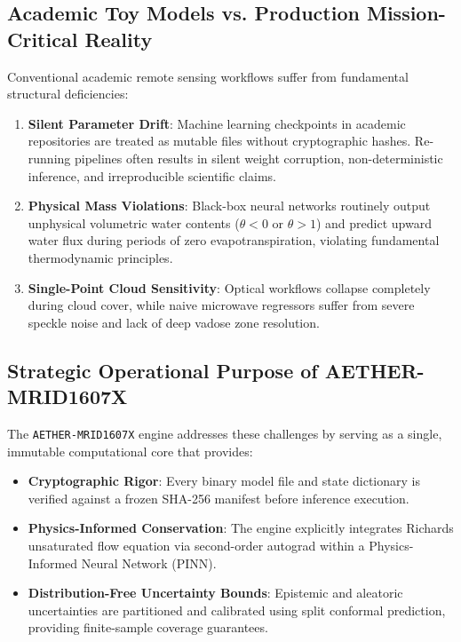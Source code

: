 \documentclass[11pt,a4paper]{article}
\theoremstyle{definition}
\theoremstyle{remark}
\begin{document}
\subsection{Academic Toy Models vs. Production Mission-Critical Reality}
Conventional academic remote sensing workflows suffer from fundamental structural deficiencies:
\begin{enumerate}
    \item \textbf{Silent Parameter Drift}: Machine learning checkpoints in academic repositories are treated as mutable files without cryptographic hashes. Re-running pipelines often results in silent weight corruption, non-deterministic inference, and irreproducible scientific claims.
    \item \textbf{Physical Mass Violations}: Black-box neural networks routinely output unphysical volumetric water contents ($\theta < 0$ or $\theta > 1$) and predict upward water flux during periods of zero evapotranspiration, violating fundamental thermodynamic principles.
    \item \textbf{Single-Point Cloud Sensitivity}: Optical workflows collapse completely during cloud cover, while naive microwave regressors suffer from severe speckle noise and lack of deep vadose zone resolution.
\end{enumerate}

\subsection{Strategic Operational Purpose of AETHER-MRID1607X}
The \texttt{AETHER-MRID1607X} engine addresses these challenges by serving as a single, immutable computational core that provides:
\begin{itemize}
    \item \textbf{Cryptographic Rigor}: Every binary model file and state dictionary is verified against a frozen SHA-256 manifest before inference execution.
    \item \textbf{Physics-Informed Conservation}: The engine explicitly integrates Richards unsaturated flow equation via second-order autograd within a Physics-Informed Neural Network (PINN).
    \item \textbf{Distribution-Free Uncertainty Bounds}: Epistemic and aleatoric uncertainties are partitioned and calibrated using split conformal prediction, providing finite-sample coverage guarantees.
\end{itemize}

\end{document}

